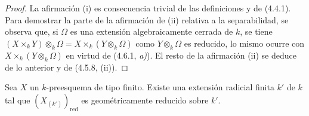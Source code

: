 \begin{proof}
La afirmación (i) es consecuencia trivial de las definiciones y de (4.4.1).
Para demostrar la parte de la afirmación de (ii) relativa a la separabilidad,
se observa que, si $\Omega$ es una extensión algebraicamente cerrada de $k$, se
tiene
$(X\times_k Y)\otimes_k\Omega=X\times_k(Y\otimes_k\Omega)$
como $Y\otimes_k\Omega$ es reducido, lo mismo ocurre con
$X\times_k(Y\otimes_k\Omega)$ en virtud de (4.6.1, \emph{a)}). El resto de la
afirmación (ii) se deduce de lo anterior y de (4.5.8, (ii)).
\end{proof}

\begin{proposition}[4.6.6]
\label{IV.2.4.6.6-fr}
Sea $X$ un $k$-preesquema de tipo finito. Existe una extensión radicial finita
$k'$ de $k$ tal que $(X_{(k')})_{\mathrm{red}}$ es geométricamente reducido
sobre $k'$.
\end{proposition}

